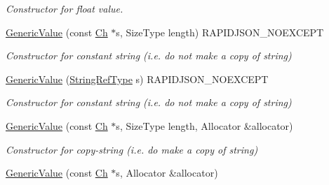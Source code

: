 \begin{DoxyCompactItemize}
\begin{DoxyCompactList}\small\item\em Constructor for float value. \end{DoxyCompactList}\item 
\hyperlink{class_generic_value_a4d9af98141360cd801daab4ed1ca2c91}{Generic\+Value} (const \hyperlink{class_generic_value_ade0e0ce64ccd5d852da57a35e720bafb}{Ch} $\ast$s, Size\+Type length) R\+A\+P\+I\+D\+J\+S\+O\+N\+\_\+\+N\+O\+E\+X\+C\+E\+PT\hypertarget{class_generic_value_a4d9af98141360cd801daab4ed1ca2c91}{}\label{class_generic_value_a4d9af98141360cd801daab4ed1ca2c91}

\begin{DoxyCompactList}\small\item\em Constructor for constant string (i.\+e. do not make a copy of string) \end{DoxyCompactList}\item 
\hyperlink{class_generic_value_abb2887958974fef1b2b5c8e32cc72ddb}{Generic\+Value} (\hyperlink{class_generic_value_a32e0f30ee278072374c8168b14d3317f}{String\+Ref\+Type} s) R\+A\+P\+I\+D\+J\+S\+O\+N\+\_\+\+N\+O\+E\+X\+C\+E\+PT\hypertarget{class_generic_value_abb2887958974fef1b2b5c8e32cc72ddb}{}\label{class_generic_value_abb2887958974fef1b2b5c8e32cc72ddb}

\begin{DoxyCompactList}\small\item\em Constructor for constant string (i.\+e. do not make a copy of string) \end{DoxyCompactList}\item 
\hyperlink{class_generic_value_a9ec2c7cda8c8845acfa3565c6b1b4e10}{Generic\+Value} (const \hyperlink{class_generic_value_ade0e0ce64ccd5d852da57a35e720bafb}{Ch} $\ast$s, Size\+Type length, Allocator \&allocator)\hypertarget{class_generic_value_a9ec2c7cda8c8845acfa3565c6b1b4e10}{}\label{class_generic_value_a9ec2c7cda8c8845acfa3565c6b1b4e10}

\begin{DoxyCompactList}\small\item\em Constructor for copy-\/string (i.\+e. do make a copy of string) \end{DoxyCompactList}\item 
\hyperlink{class_generic_value_a9b72b2e3347d4cd77b16c3b45e8decf1}{Generic\+Value} (const \hyperlink{class_generic_value_ade0e0ce64ccd5d852da57a35e720bafb}{Ch} $\ast$s, Allocator \&allocator)\hypertarget{class_generic_value_a9b72b2e3347d4cd77b16c3b45e8decf1}{}\label{class_generic_value_a9b72b2e3347d4cd77b16c3b45e8decf1}


\end{DoxyCompactItemize}
